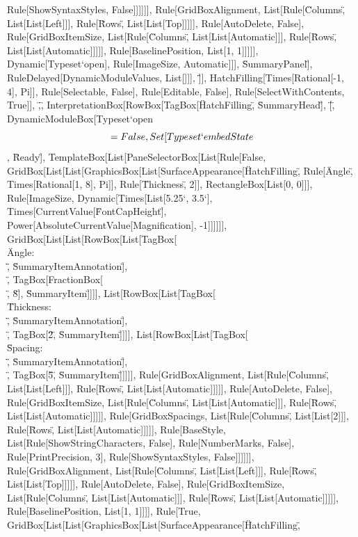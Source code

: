 \documentclass{article}
\begin{document}
{{{{Rule[ShowSyntaxStyles, False]]]]]], Rule[GridBoxAlignment, List[Rule[\"Columns\", List[List[Left]]], Rule[\"Rows\", List[List[Top]]]]], Rule[AutoDelete,
False], Rule[GridBoxItemSize, List[Rule[\"Columns\", List[List[Automatic]]], Rule[\"Rows\", List[List[Automatic]]]]], Rule[BaselinePosition, List[1,
1]]]]], Dynamic[Typeset`open$$], Rule[ImageSize, Automatic]]], \"SummaryPanel\"], RuleDelayed[DynamicModuleValues, List[]]], \"]\"}], HatchFilling[Times[Rational[-1,
4], Pi]], Rule[Selectable, False], Rule[Editable, False], Rule[SelectWithContents, True]], \",\", InterpretationBox[RowBox[{TagBox[\"HatchFilling\",
\"SummaryHead\"], \"[\", DynamicModuleBox[{Typeset`open$$ = False, Set[Typeset`embedState$$, \"Ready\"]}, TemplateBox[List[PaneSelectorBox[List[Rule[False,
GridBox[List[List[GraphicsBox[List[SurfaceAppearance[\"HatchFilling\", Rule[\"Angle\", Times[Rational[1, 8], Pi]], Rule[\"Thickness\", 2]], RectangleBox[List[0,
0]]], Rule[ImageSize, Dynamic[Times[List[5.25`, 3.5`], Times[CurrentValue[\"FontCapHeight\"], Power[AbsoluteCurrentValue[Magnification], -1]]]]]],
GridBox[List[List[RowBox[List[TagBox[\"\\\"Angle: \\\"\", \"SummaryItemAnnotation\"], \"\\[InvisibleSpace]\", TagBox[FractionBox[\"\\[Pi]\", \"8\"],
\"SummaryItem\"]]]], List[RowBox[List[TagBox[\"\\\"Thickness: \\\"\", \"SummaryItemAnnotation\"], \"\\[InvisibleSpace]\", TagBox[\"2\", \"SummaryItem\"]]]],
List[RowBox[List[TagBox[\"\\\"Spacing: \\\"\", \"SummaryItemAnnotation\"], \"\\[InvisibleSpace]\", TagBox[\"5\", \"SummaryItem\"]]]]], Rule[GridBoxAlignment,
List[Rule[\"Columns\", List[List[Left]]], Rule[\"Rows\", List[List[Automatic]]]]], Rule[AutoDelete, False], Rule[GridBoxItemSize, List[Rule[\"Columns\",
List[List[Automatic]]], Rule[\"Rows\", List[List[Automatic]]]]], Rule[GridBoxSpacings, List[Rule[\"Columns\", List[List[2]]], Rule[\"Rows\", List[List[Automatic]]]]],
Rule[BaseStyle, List[Rule[ShowStringCharacters, False], Rule[NumberMarks, False], Rule[PrintPrecision, 3], Rule[ShowSyntaxStyles, False]]]]]], Rule[GridBoxAlignment,
List[Rule[\"Columns\", List[List[Left]]], Rule[\"Rows\", List[List[Top]]]]], Rule[AutoDelete, False], Rule[GridBoxItemSize, List[Rule[\"Columns\",
List[List[Automatic]]], Rule[\"Rows\", List[List[Automatic]]]]], Rule[BaselinePosition, List[1, 1]]]], Rule[True, GridBox[List[List[GraphicsBox[List[SurfaceAppearance[\"HatchFilling\",
}}}}
\end{document}
